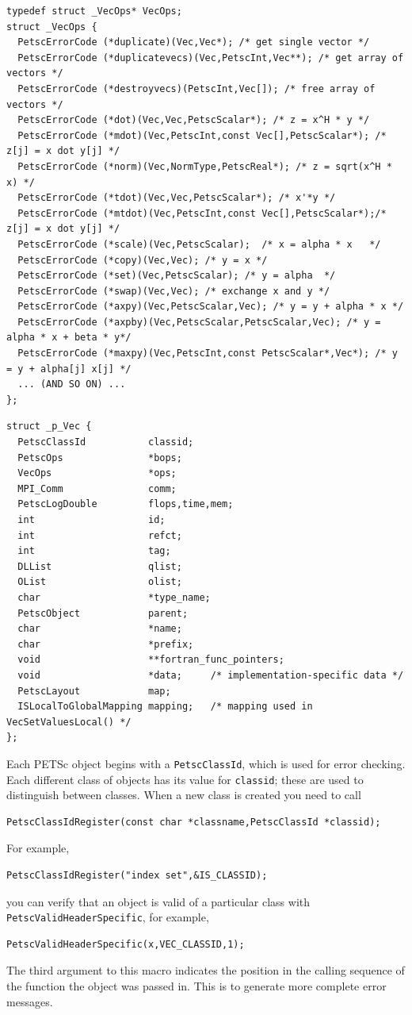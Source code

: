 \begin{lstlisting}[caption=Function table common to all PETSc-compatible vector objects (truncated)]
typedef struct _VecOps* VecOps;
struct _VecOps {
  PetscErrorCode (*duplicate)(Vec,Vec*); /* get single vector */
  PetscErrorCode (*duplicatevecs)(Vec,PetscInt,Vec**); /* get array of vectors */
  PetscErrorCode (*destroyvecs)(PetscInt,Vec[]); /* free array of vectors */
  PetscErrorCode (*dot)(Vec,Vec,PetscScalar*); /* z = x^H * y */
  PetscErrorCode (*mdot)(Vec,PetscInt,const Vec[],PetscScalar*); /* z[j] = x dot y[j] */
  PetscErrorCode (*norm)(Vec,NormType,PetscReal*); /* z = sqrt(x^H * x) */
  PetscErrorCode (*tdot)(Vec,Vec,PetscScalar*); /* x'*y */
  PetscErrorCode (*mtdot)(Vec,PetscInt,const Vec[],PetscScalar*);/* z[j] = x dot y[j] */
  PetscErrorCode (*scale)(Vec,PetscScalar);  /* x = alpha * x   */
  PetscErrorCode (*copy)(Vec,Vec); /* y = x */
  PetscErrorCode (*set)(Vec,PetscScalar); /* y = alpha  */
  PetscErrorCode (*swap)(Vec,Vec); /* exchange x and y */
  PetscErrorCode (*axpy)(Vec,PetscScalar,Vec); /* y = y + alpha * x */
  PetscErrorCode (*axpby)(Vec,PetscScalar,PetscScalar,Vec); /* y = alpha * x + beta * y*/
  PetscErrorCode (*maxpy)(Vec,PetscInt,const PetscScalar*,Vec*); /* y = y + alpha[j] x[j] */
  ... (AND SO ON) ...
};
\end{lstlisting}
\begin{lstlisting}[caption= Data structure header common to all PETSc vector classes]
struct _p_Vec {
  PetscClassId           classid;
  PetscOps               *bops;
  VecOps                 *ops;
  MPI_Comm               comm;
  PetscLogDouble         flops,time,mem;
  int                    id;
  int                    refct;
  int                    tag;
  DLList                 qlist;
  OList                  olist;
  char                   *type_name;
  PetscObject            parent;
  char                   *name;
  char                   *prefix;
  void                   **fortran_func_pointers;
  void                   *data;     /* implementation-specific data */
  PetscLayout            map;
  ISLocalToGlobalMapping mapping;   /* mapping used in VecSetValuesLocal() */
};
\end{lstlisting}

Each PETSc object begins with a \lstinline{PetscClassId}, which is used for error checking.
Each different class of objects has its value for \lstinline{classid}; these are used
to distinguish between classes. When a new class is created you need to call
\begin{lstlisting}
PetscClassIdRegister(const char *classname,PetscClassId *classid);
\end{lstlisting}
For example,
\begin{lstlisting}
PetscClassIdRegister("index set",&IS_CLASSID);
\end{lstlisting}
you can verify that an object is valid of a particular class with \lstinline{PetscValidHeaderSpecific}, for example,
\begin{lstlisting}
PetscValidHeaderSpecific(x,VEC_CLASSID,1);
\end{lstlisting}
The third argument to this macro indicates the position in the calling sequence of the
function the object was passed in. This is to generate more complete error messages.

